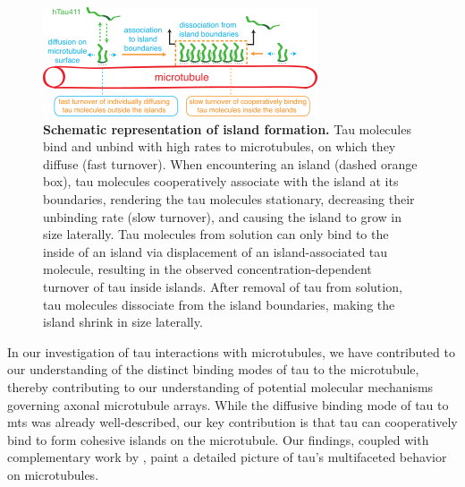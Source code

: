 \begin{figure}[h!tb]
\centering
\includegraphics[scale=1]{Figures/tau8.png}
\caption[Schematic representation of island formation.]{
\textbf{Schematic representation of island formation.} Tau molecules bind and unbind with high rates to microtubules, on which they diffuse (fast turnover). When encountering an island (dashed orange box), tau molecules cooperatively associate with the island at its boundaries, rendering the tau molecules stationary, decreasing their unbinding rate (slow turnover), and causing the island to grow in size laterally. Tau molecules from solution can only bind to the inside of an island via displacement of an island-associated tau molecule, resulting in the observed concentration-dependent turnover of tau inside islands. After removal of tau from solution, tau molecules dissociate from the island boundaries, making the island shrink in size laterally.
	}\label{tau8}
\end{figure}
In our investigation of tau interactions with microtubules, we have contributed to our understanding of the distinct binding modes of tau to the microtubule, thereby contributing to our understanding of potential molecular mechanisms governing axonal microtubule arrays. While the diffusive binding mode of tau to mts was already well-described, our key contribution is that tau can cooperatively bind to form cohesive islands on the microtubule. Our findings, coupled with complementary work by \cite{tan2019microtubules}, paint a detailed picture of tau's multifaceted behavior on microtubules.\par

